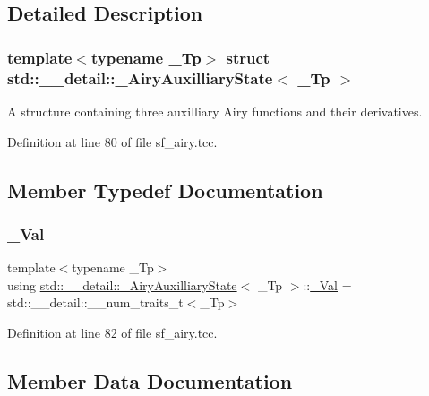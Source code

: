 \subsection{Detailed Description}
\subsubsection*{template$<$typename \+\_\+\+Tp$>$\newline
struct std\+::\+\_\+\+\_\+detail\+::\+\_\+\+Airy\+Auxilliary\+State$<$ \+\_\+\+Tp $>$}

A structure containing three auxilliary Airy functions and their derivatives. 

Definition at line 80 of file sf\+\_\+airy.\+tcc.



\subsection{Member Typedef Documentation}
\mbox{\label{structstd_1_1____detail_1_1__AiryAuxilliaryState_a5f44a95a23b7c60f0b748df5f7f24f26}} 
\subsubsection{\texorpdfstring{\+\_\+\+Val}{\_Val}}
{\footnotesize\ttfamily template$<$typename \+\_\+\+Tp$>$ \\
using \hyperlink{structstd_1_1____detail_1_1__AiryAuxilliaryState}{std\+::\+\_\+\+\_\+detail\+::\+\_\+\+Airy\+Auxilliary\+State}$<$ \+\_\+\+Tp $>$\+::\hyperlink{structstd_1_1____detail_1_1__AiryAuxilliaryState_a5f44a95a23b7c60f0b748df5f7f24f26}{\+\_\+\+Val} =  std\+::\+\_\+\+\_\+detail\+::\+\_\+\+\_\+num\+\_\+traits\+\_\+t$<$\+\_\+\+Tp$>$}



Definition at line 82 of file sf\+\_\+airy.\+tcc.



\subsection{Member Data Documentation}
\mbox{\label{structstd_1_1____detail_1_1__AiryAuxilliaryState_acff728bf75b30e81549a554ef4c149c1}} 
